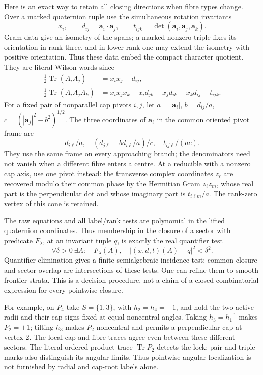 Here is an exact way to retain all closing directions when fibre types change. Over a marked quaternion tuple use the simultaneous rotation invariants
\[
              x_i,\qquad d_{ij}=\mathbf a_i\cdot\mathbf a_j,\qquad
              t_{ijk}=\det(\mathbf a_i,\mathbf a_j,\mathbf a_k).
\]
Gram data give an isometry of the spans; a marked nonzero triple fixes its orientation in rank three, and in lower rank one may extend the isometry with positive orientation. Thus these data embed the compact character quotient. They are literal Wilson words since
\begin{align}
 \tfrac12\operatorname{Tr}(A_iA_j)&=x_ix_j-d_{ij},\nonumber\\
 \tfrac12\operatorname{Tr}(A_iA_jA_k)
 &=x_ix_jx_k-x_i d_{jk}-x_j d_{ik}-x_k d_{ij}-t_{ijk}.
 \label{geo:wilsontraces}
\end{align}
For a fixed pair of nonparallel cap pivots \(i,j\), let
\(a=|\mathbf a_i|\), \(b=d_{ij}/a\), \(c=(|\mathbf a_j|^2-b^2)^{1/2}\).
The three coordinates of \(\mathbf a_\ell\) in the common oriented pivot frame are
\[
                  d_{i\ell}/a,\quad
                  (d_{j\ell}-b d_{i\ell}/a)/c,\quad
                  t_{ij\ell}/(ac).
\]
They use the same frame on every approaching branch; the denominators need not vanish when a different fibre enters a centre. At a reducible with a nonzero cap axis, use one pivot instead: the transverse complex coordinates \(z_\ell\) are recovered modulo their common phase by the Hermitian Gram \(\overline z_\ell z_m\), whose real part is the perpendicular dot and whose imaginary part is \(t_{i\ell m}/a\). The rank-zero vertex of this cone is retained.

The raw equations and all label/rank tests are polynomial in the lifted quaternion coordinates. Thus membership in the closure of a sector with predicate \(F_\lambda\), at an invariant tuple \(q\), is exactly the real quantifier test
\[
 \forall\delta>0\ \exists A:\quad F_\lambda(A),\quad
                          |(x,d,t)(A)-q|^2<\delta^2 .
\]
Quantifier elimination gives a finite semialgebraic incidence test; common closure and sector overlap are intersections of these tests. One can refine them to smooth frontier strata. This is a decision procedure, not a claim of a closed combinatorial expression for every pointwise closure.

For example, on \(P_4\) take \(S=\{1,3\}\), with \(h_2=h_4=-1\), and hold the two active radii and their cap signs fixed at equal noncentral angles. Taking \(h_3=h_1^{-1}\) makes \(P_2=+1\); tilting \(h_3\) makes \(P_2\) noncentral and permits a perpendicular cap at vertex 2. The local cap and fibre traces agree even between these different sectors. The literal ordered-product trace \(\operatorname{Tr}P_2\) detects the lock; pair and triple marks also distinguish its angular limits. Thus pointwise angular localization is not furnished by radial and cap-root labels alone.

